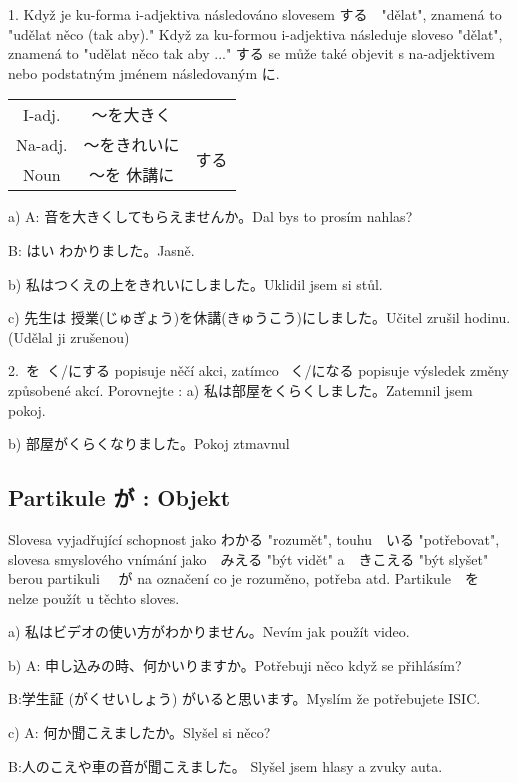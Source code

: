 1. Když je ku-forma i-adjektiva následováno slovesem する　"dělat", znamená to "udělat něco (tak aby)." Když za ku-formou i-adjektiva následuje sloveso "dělat", znamená to "udělat něco tak aby ..."  する  se může také objevit s na-adjektivem nebo podstatným jménem následovaným  に.
\begin{center}
\begin{tabular}{|c|c|c|}
\hline
I-adj.&〜を大きく&\\

Na-adj.&〜をきれいに&\multirow{3}{*}{する}\\

Noun&〜を 休講に&\\
\hline
\end{tabular}
\end{center}


a)
 A: 音を大きくしてもらえませんか。Dal bys to prosím nahlas?

B: はい わかりました。Jasně.

b) 私はつくえの上をきれいにしました。Uklidil jsem si stůl.


c) 先生は 授業(じゅぎょう)を休講(きゅうこう)にしました。Učitel zrušil hodinu. (Udělal ji zrušenou)



2.~を~く/にする popisuje něčí akci, zatímco  ~く/になる popisuje výsledek změny způsobené akcí.
Porovnejte :
a) 私は部屋をくらくしました。Zatemnil jsem pokoj.

b) 部屋がくらくなりました。Pokoj ztmavnul

\subsection{ Partikule が : Objekt}
Slovesa vyjadřující schopnost jako  わかる "rozumět", touhu　いる "potřebovat", slovesa smyslového vnímání jako　みえる "být vidět" a　きこえる "být slyšet" berou partikuli 　が na označení co je rozuměno, potřeba atd. Partikule　を nelze použít u těchto sloves.


a) 私はビデオの使い方がわかりません。Nevím jak použít video.

b) A: 申し込みの時、何かいりますか。Potřebuji něco když se přihlásím?

B:学生証 (がくせいしょう) がいると思います。Myslím že potřebujete ISIC.

c) A: 何か聞こえましたか。Slyšel si něco?

B:人のこえや車の音が聞こえました。 Slyšel jsem hlasy a zvuky auta.



